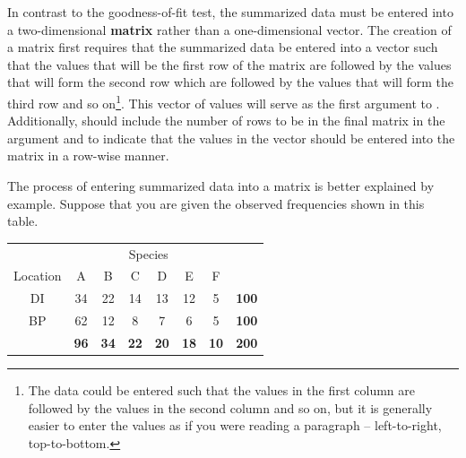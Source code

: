 \documentclass[10pt,openany]{book}\usepackage[]{graphicx}\usepackage[]{color}
\begin{document}
In contrast to the goodness-of-fit test, the summarized data must be entered into a two-dimensional \textbf{matrix} rather than a one-dimensional vector.  The creation of a matrix first requires that the summarized data be entered into a vector such that the values that will be the first row of the matrix are followed by the values that will form the second row which are followed by the values that will form the third row and so on\footnote{The data could be entered such that the values in the first column are followed by the values in the second column and so on, but it is generally easier to enter the values as if you were reading a paragraph -- left-to-right, top-to-bottom.}.  This vector of values will serve as the first argument to .  Additionally,  should include the number of rows to be in the final matrix in the  argument and  to indicate that the values in the vector should be entered into the matrix in a row-wise manner.


The process of entering summarized data into a matrix is better explained by example.  Suppose that you are given the observed frequencies shown in this table.

\begin{center}
  \begin{tabular}{c|c|c|c|c|c|c|c|}
    \multicolumn{1}{c}{} & \multicolumn{6}{c}{Species} & \multicolumn{1}{c}{} \\
    \cline{2-7}
    Location & A & B & C & D & E & F & \multicolumn{1}{c}{} \\
    \hline
    \multicolumn{1}{|c|}{DI} & 34 & 22 & 14 & 13 & 12 & 5 & \textbf{100} \\
    \hline
    \multicolumn{1}{|c|}{BP} & 62 & 12 & 8 & 7 & 6 & 5 & \textbf{100} \\
    \hline
    & \textbf{96} & \textbf{34} & \textbf{22} & \textbf{20} & \textbf{18} & \textbf{10} & \textbf{200} \\
    \cline{2-8}
  \end{tabular}
\end{center}
\end{document}
